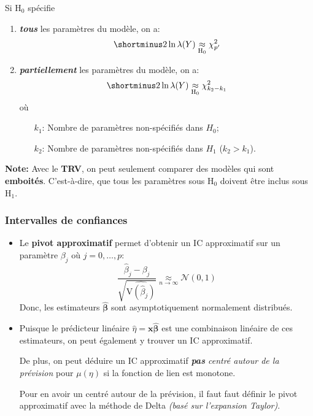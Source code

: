 \documentclass[10pt, french]{article}
\begin{document}
\begin{multicols*}{3}
Si $\textrm{H}_0$ spécifie
\begin{enumerate}[label=\faAngleRight]
	\item	\textbf{\textit{tous}} les paramètres du modèle, on a:
	\[
		\shortminus 2 \ln \lambda(Y) \underset{\textrm{H}_0}{\approx} \chi_{p'}^2
	\]
	\item 	\textbf{\textit{partiellement}} les paramètres du modèle, on a:
	\[
		\shortminus 2 \ln \lambda(Y) \underset{\textrm{H}_0}{\approx} \chi_{k_2 - k_1}^2
	\]
	où 
	\begin{enumerate}
	\item[$k_1$: ] Nombre de paramètres non-spécifiés dans $H_0$;
	\item[$k_2$: ] Nombre de paramètres non-spécifiés dans $H_1$ ($k_2 > k_1$).
	\end{enumerate}
\end{enumerate}

\textbf{Note: }Avec le \textbf{TRV}, on peut seulement comparer des modèles qui sont \textbf{emboités}. C'est-à-dire, que tous les paramètres sous $\textrm{H}_0$ doivent être inclus sous $\textrm{H}_1$.

\subsubsection*{Intervalles de confiances}

\begin{itemize}
	\item	Le \textbf{pivot approximatif} permet d'obtenir un IC approximatif sur un paramètre $\beta_{j}$ où $j = 0, \dots, p$:
	\begin{equation*}
		\frac{\hat{\beta}_{j} - \beta_{j}}{\sqrt{\widehat{\text{V}(\hat{\beta}_{j})}}}
		\underset{n \rightarrow \infty}{\approx} \mathcal{N}(0, 1)
	\end{equation*}
	Donc, les estimateurs $\bm{\hat{\beta}}$ sont asymptotiquement normalement distribués.
	\item	Puisque le prédicteur linéaire $\hat{\eta} = \bm{x}\bm{\hat{\beta}}$ est une combinaison linéaire de ces estimateurs, on peut également y trouver un IC approximatif.
	
	De plus, on peut déduire un IC approximatif \textit{\textbf{pas} centré autour de la prévision} pour $\mu(\eta)$ si la fonction de lien est monotone.
	
	Pour en avoir un centré autour de la prévision, il faut faut définir le pivot approximatif avec la méthode de Delta \textit{(basé sur l'expansion Taylor)}.
	

\end{itemize}
\end{multicols*}
\end{document}
